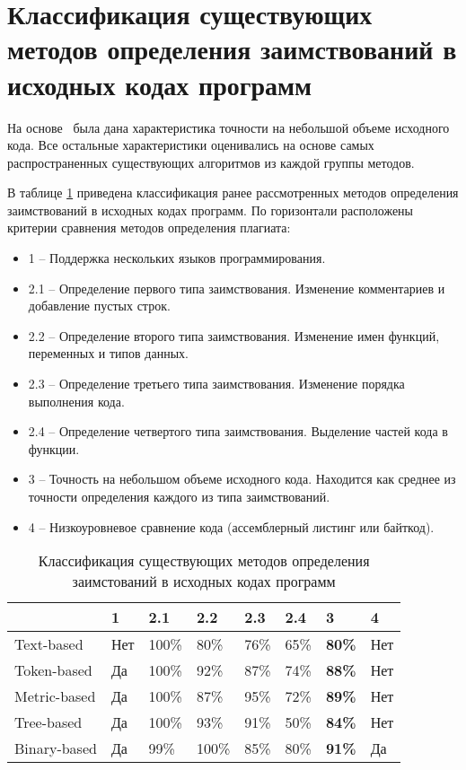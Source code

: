 \section{Классификация существующих методов определения заимствований в исходных кодах программ}

На основе~\cite{treb} была дана характеристика точности на небольшой объеме исходного кода. Все остальные характеристики оценивались на основе самых распространенных существующих алгоритмов из каждой группы методов.

В таблице \ref{tab:compare} приведена классификация ранее рассмотренных методов определения заимствований в исходных кодах программ. По горизонтали расположены критерии сравнения методов определения плагиата:
\begin{itemize}[label*=---]
	\item 1 -- Поддержка нескольких языков программирования.
	\item 2.1 -- Определение первого типа заимствования. Изменение комментариев и добавление пустых строк.
	\item 2.2 -- Определение второго типа заимствования. Изменение имен функций, переменных и типов данных.
	\item 2.3 -- Определение третьего типа заимствования. Изменение порядка выполнения кода.
	\item 2.4 -- Определение четвертого типа заимствования. Выделение частей кода в функции.
	\item 3 -- Точность на небольшом объеме исходного кода. Находится как среднее из точности определения каждого из типа заимствований. 
	\item 4 -- Низкоуровневое сравнение кода (ассемблерный листинг или байткод).
\end{itemize}

\begin{table}[hbtp]
	\begin{center}
		\begin{flushleft}
			\caption{\label{tab:compare}Классификация существующих методов определения заимстований в исходных кодах программ}
		\end{flushleft}
		\begin{tabular}{|l | l | l | l | l | l | l | l |} 
			\hline 
             ~					& {1}	 &    {2.1} &   {2.2} & {2.3} & {2.4} & {3} & {4} \\ \hline
			Text-based   & Нет  &   100\%  & 80\%    &  76\%   &  65\%    &  \textbf{80\% }& Нет  \\ \hline
			Token-based  &  Да &   100\%  &  92\%   & 87\%  &  74\%  &    \textbf{88\% } & Нет  \\ \hline
			Metric-based &   Да &   100\%   &  87\%   & 95\%    &  72\%   & \textbf{89\% }& Нет  \\ \hline
			Tree-based   &   Да &    100\%  &  93\%   &  91\%   &  50\%  &  \textbf{84\%}& Нет  \\ \hline
			Binary-based &  Да &    99\%  &  100\%   &   85\%   &   80\%  &  \textbf{91\%}& Да \\  \hline
		\end{tabular}
	\end{center}
\end{table}